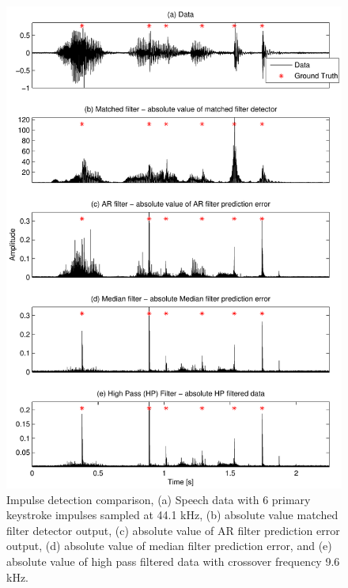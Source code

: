 \begin{figure}[!] %
\centering
\includegraphics[width=130mm]{LitRev_DetectCompare.pdf}
\caption{Impulse detection comparison, (a) Speech data with 6 primary keystroke impulses sampled at 44.1 kHz, (b) absolute value matched filter detector output, (c) absolute value of AR filter prediction error output, (d) absolute value of median filter prediction error, and (e) absolute value of high pass filtered data with crossover frequency 9.6 kHz.}
\label{fig:LitRev_DetectCompare}
\end{figure}

